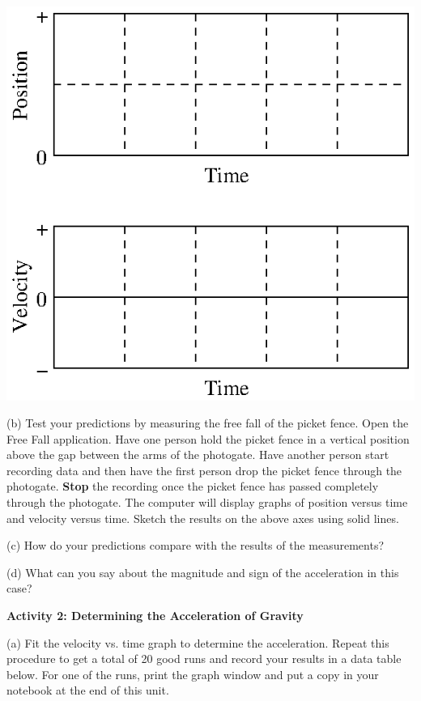 \vspace{0.3cm}
{\par\centering \includegraphics{acceleration_fig1.eps} \par}
\vspace{0.3cm}

(b) Test your predictions by measuring the free fall of the picket fence. Open
the Free Fall application. Have one person hold the picket fence in a vertical
position above the gap between the arms of the photogate. Have another person
start recording data and then have the first person drop the picket fence through
the photogate. \textbf{Stop} the recording once the picket fence has passed
completely through the photogate. The computer will display graphs of position
versus time and velocity versus time. Sketch the results on the above axes using
solid lines.

(c) How do your predictions compare with the results of the measurements?
\vspace{20mm}

(d) What can you say about the magnitude and sign of the acceleration in this
case?
\vspace{20mm}

\textbf{Activity 2: Determining the Acceleration of Gravity }

(a) Fit the velocity vs. time graph to determine the acceleration. Repeat this
procedure to get a total of 20 good runs and record your results in a data table
below. For one of the runs, print the graph window and put a copy in your notebook
at the end of this unit.
\vspace{50mm}

